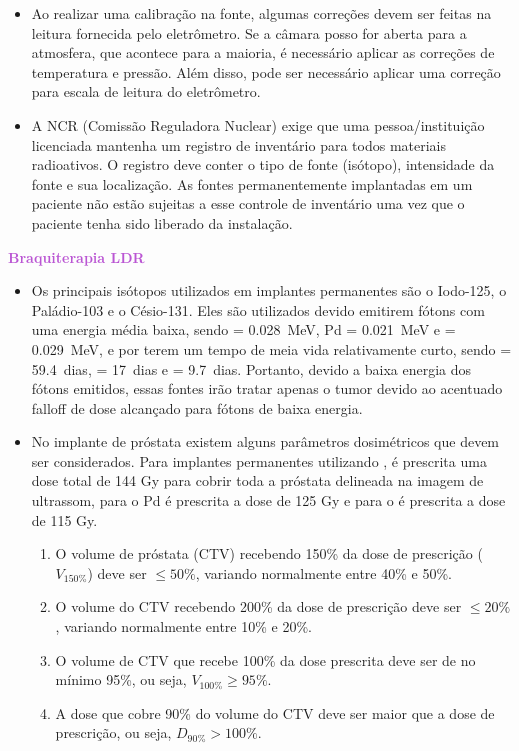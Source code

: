 \documentclass[11pt,a4paper]{article}
\newcounter{exemplo}
\begin{document}
\begin{exemplo}[Braquiterapia]
\begin{itemize}
        \item Ao realizar uma calibração na fonte, algumas correções devem ser feitas na leitura fornecida pelo eletrômetro. Se a câmara posso for aberta para a atmosfera, que acontece para a maioria, é necessário aplicar as correções de temperatura e pressão. Além disso, pode ser necessário aplicar uma correção para escala de leitura do eletrômetro. 
        
        \item A NCR (Comissão Reguladora Nuclear) exige que uma pessoa/instituição licenciada mantenha um registro de inventário para todos materiais radioativos. O registro deve conter o tipo de fonte (isótopo), intensidade da fonte e sua localização. As fontes permanentemente implantadas em um paciente não estão sujeitas a esse controle de inventário uma vez que o paciente tenha sido liberado da instalação. 

    \end{itemize}

    \textcolor{MediumOrchid}{\LobsterTwo\textbf{Braquiterapia LDR}}
    \begin{itemize}
        \item Os principais isótopos utilizados em implantes permanentes são o Iodo-125, o Paládio-103 e o Césio-131.  Eles são utilizados devido emitirem fótons com uma energia média baixa, sendo  = \qty{0.028}{MeV}, Pd = \qty{0,021}{MeV} e  = \qty{0,029}{MeV}, e por terem um tempo de meia vida relativamente curto, sendo  = \qty{59.4}{dias},  = \qty{17}{dias} e  = \qty{9.7}{dias}. Portanto, devido a baixa energia dos fótons emitidos, essas fontes irão tratar apenas o tumor devido ao acentuado falloff de dose alcançado para fótons de baixa energia.
        
        \item No implante de próstata existem alguns parâmetros dosimétricos que devem ser considerados. Para implantes permanentes utilizando , é prescrita uma dose total de 144 Gy para cobrir toda a próstata delineada na imagem de ultrassom, para o Pd é prescrita a dose de 125 Gy e para o  é prescrita a dose de 115 Gy.
            \begin{enumerate}[label=label=\textcolor{CarnationPink}{\alph*)}]
                \item  O volume de próstata (CTV) recebendo 150\% da dose de prescrição ($V_{150\%}$) deve ser $\leq 50\%$, variando normalmente entre 40\% e 50\%.
                \item O volume do CTV recebendo 200\% da dose de prescrição deve ser $\leq 20\%$, variando normalmente entre 10\% e 20\%.
                \item O volume de CTV que recebe 100\% da dose prescrita deve ser de no mínimo 95\%, ou seja, $V_{100\%} \geq 95\%$.
                \item A dose que cobre 90\% do volume do CTV deve ser maior que a dose de prescrição, ou seja, $D_{90\%} > 100\%$. 
            \end{enumerate}


\end{itemize}
\end{exemplo}
\end{document}
